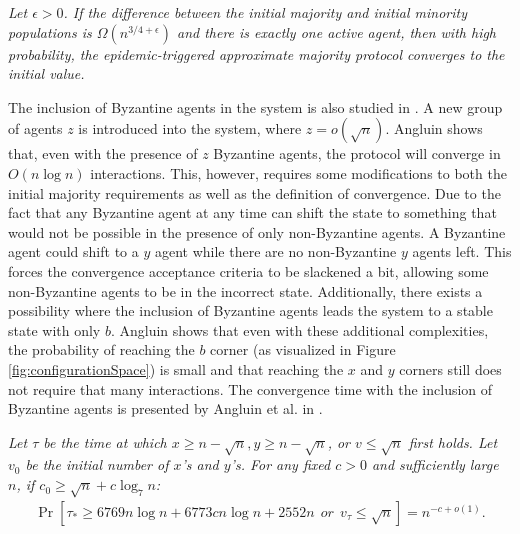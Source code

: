  \begin{theorem}
    \textit{Let $\epsilon > 0$. If the difference between the initial majority and initial minority populations is $\Omega(n^{3/4+\epsilon})$ and there is exactly one active agent, then with high probability, the epidemic-triggered approximate majority protocol converges to the initial value.}
 \end{theorem} 

 The inclusion of Byzantine agents in the system is also studied in \cite{angluinSimplePopulationProtocol2008}. A new group of agents $z$ is introduced into the system, where $z = o(\sqrt{n})$. Angluin shows that, even with the presence of $z$ Byzantine agents, the protocol will converge in $O(n \log n)$ interactions. This, however, requires some modifications to both the initial majority requirements as well as the definition of convergence. Due to the fact that any Byzantine agent at any time can shift the state to something that would not be possible in the presence of only non-Byzantine agents. A Byzantine agent could shift to a $y$ agent while there are no non-Byzantine $y$ agents left. This forces the convergence acceptance criteria to be slackened a bit, allowing some non-Byzantine agents to be in the incorrect state. Additionally, there exists a possibility where the inclusion of Byzantine agents leads the system to a stable state with only $b$. Angluin shows that even with these additional complexities, the probability of reaching the $b$ corner (as visualized in Figure \ref{fig:configurationSpace}) is small and that reaching the $x$ and $y$ corners still does not require that many interactions. The convergence time with the inclusion of Byzantine agents is presented by Angluin et al. in .
 
 \begin{theorem}
    \textit{Let $\tau$ be the time at which $x \geq n - \sqrt{n}, y \geq n - \sqrt{n}$, or $v \leq \sqrt{n}$ first holds. Let $v_0$ be the initial number of $x$'s and $y$'s. For any fixed $c > 0$ and sufficiently large $n$, if $c_0 \geq \sqrt{n} + c \log_7n$:} 
    \begin{align}
        \Pr [ \tau_* \geq 6769n \log n + 6773 c n \log n + 2552n \: \: or \: \: v_{\tau} \leq \sqrt{n}] = n^{-c+o(1)}.  \label{angluinTheorem4} 
    \end{align}
 \end{theorem} 
 
